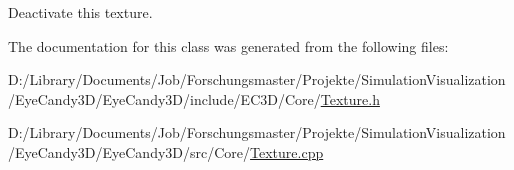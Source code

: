Deactivate this texture. 

The documentation for this class was generated from the following files\+:\begin{DoxyCompactItemize}
\item 
D\+:/\+Library/\+Documents/\+Job/\+Forschungsmaster/\+Projekte/\+Simulation\+Visualization/\+Eye\+Candy3\+D/\+Eye\+Candy3\+D/include/\+E\+C3\+D/\+Core/\mbox{\hyperlink{_texture_8h}{Texture.\+h}}\item 
D\+:/\+Library/\+Documents/\+Job/\+Forschungsmaster/\+Projekte/\+Simulation\+Visualization/\+Eye\+Candy3\+D/\+Eye\+Candy3\+D/src/\+Core/\mbox{\hyperlink{_texture_8cpp}{Texture.\+cpp}}\end{DoxyCompactItemize}
